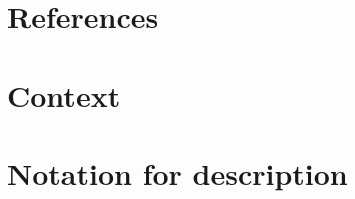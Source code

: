 \section{References} \label{s:introduction:references}
	\begin{comment}
		List all of the applicable reference documents. The references are separated into “external” references
		that are imposed external to the project and “internal” references that are imposed from within to the
		project. This may also be at the end of the document.
	\end{comment}
\section{Context} \label{s:introduction:context}
	\begin{comment}
		Provide any required context that is not already covered by other sections of this document (e.g., thirdparty
		testing via the Internet).
	\end{comment}
	
\section{Notation for description} \label{s:introduction:notation-for-description}
	\begin{comment}
		Define any numbering schemes, e.g., for scenarios and test cases. The intent of this section is to
		explain any such schema.
	\end{comment}

	